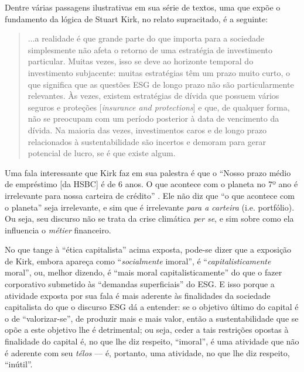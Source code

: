 \documentclass[12pt]{article}
\numberwithin{equation}{section}
\theoremstyle{plain}
\theoremstyle{definition}
\theoremstyle{remark}
\begin{document}
Dentre várias passagens ilustrativas em sua série de textos, uma que expõe o fundamento da lógica de Stuart Kirk, no relato supracitado, é a seguinte:
\begin{quote}
    ...a realidade é que grande parte do que importa para a sociedade simplesmente não afeta o retorno de uma estratégia de investimento particular. Muitas vezes, isso se deve ao horizonte temporal do investimento subjacente: muitas estratégias têm um prazo muito curto, o que significa que as questões ESG de longo prazo não são particularmente relevantes. Às vezes, existem estratégias de dívida que possuem vários seguros e proteções [\textit{insurance and protections}] e que, de qualquer forma, não se preocupam com um período posterior à data de vencimento da dívida. Na maioria das vezes, investimentos caros e de longo prazo relacionados à sustentabilidade são incertos e demoram para gerar potencial de lucro, se é que existe algum. \parencite[p. 15]{Fancy2021}
\end{quote}

Uma fala interessante que Kirk faz em sua palestra é que o ``Nosso prazo médio de empréstimo {[}da HSBC{]} é de 6 anos. O que acontece com o planeta no 7º ano é irrelevante para nossa carteira de crédito'' \parencite{Kirk2022}. Ele não diz que ``o que acontece com o planeta'' seja irrelevante, e sim que é irrelevante \textit{para a carteira} (i.e. portfólio). Ou seja, seu discurso não se trata da crise climática \textit{per se}, e sim sobre como ela influencia o \textit{métier} financeiro.

No que tange à ``ética capitalista'' acima exposta, pode-se dizer que a exposição de Kirk, embora apareça como ``\textit{socialmente} imoral'', é ``\textit{capitalisticamente} moral'', ou, melhor dizendo, é ``mais moral capitalisticamente'' do que o fazer corporativo submetido às ``demandas superficiais'' do ESG. E isso porque a atividade exposta por sua fala é mais aderente às finalidades da sociedade capitalista do que o discurso ESG dá a entender: se o objetivo último do capital é o de ``valorizar-se'', de produzir mais e mais valor, então a sustentabilidade que se opõe a este objetivo lhe é detrimental; ou seja, ceder a tais restrições opostas à finalidade do capital é, no que lhe diz respeito, ``imoral'', é uma atividade que não é aderente com seu \textit{télos} --- é, portanto, uma atividade, no que lhe diz respeito, ``inútil''. %
\end{document}

